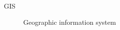 \label{sec:abbriv}
\vspace{5mm}

\begin{description}
\item [GIS] Geographic information system
\end{description}


